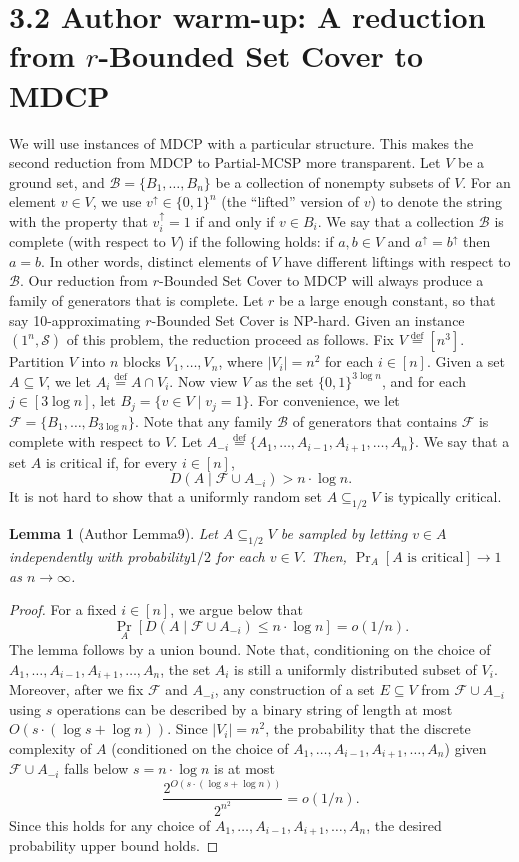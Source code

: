 \documentclass[10pt,a4paper]{article}
\newtheorem{ntlemma}[nttheorem]{Lemma}
\begin{document}
\section*{3.2 Author warm-up: A reduction from $r$-Bounded Set Cover to MDCP}
We will use instances of MDCP with a particular structure. This makes the second reduction from MDCP to Partial-MCSP more transparent.
Let $V$ be a ground set, and $\mathcal B=\{B_1,\ldots,B_n\}$ be a collection of nonempty subsets of $V$. For an element $v\in V$, we use $v^\uparrow\in\{0,1\}^n$ (the ``lifted'' version of $v$) to denote the string with the property that $v_i^\uparrow=1$ if and only if $v\in B_i$. We say that a collection $\mathcal B$ is complete (with respect to $V$) if the following holds: if $a,b\in V$ and $a^\uparrow=b^\uparrow$ then $a=b$. In other words, distinct elements of $V$ have different liftings with respect to $\mathcal B$. Our reduction from $r$-Bounded Set Cover to MDCP will always produce a family of generators that is complete.
Let $r$ be a large enough constant, so that say 10-approximating $r$-Bounded Set Cover is NP-hard. Given an instance $(1^n,\mathcal S)$ of this problem, the reduction proceed as follows. Fix $V\stackrel{\mathrm{def}}=[n^3]$. Partition $V$ into $n$ blocks $V_1,\ldots,V_n$, where $|V_i|=n^2$ for each $i\in[n]$. Given a set $A\subseteq V$, we let $A_i\stackrel{\mathrm{def}}=A\cap V_i$. Now view $V$ as the set $\{0,1\}^{3\log n}$, and for each $j\in[3\log n]$, let $B_j=\{v\in V\mid v_j=1\}$. For convenience, we let $\mathcal F=\{B_1,\ldots,B_{3\log n}\}$. Note that any family $\mathcal B$ of generators that contains $\mathcal F$ is complete with respect to $V$.
Let $A_{-i}\stackrel{\mathrm{def}}=\{A_1,\ldots,A_{i-1},A_{i+1},\ldots,A_n\}$. We say that a set $A$ is critical if, for every $i\in[n]$,
\[D(A\mid\mathcal F\cup A_{-i})>n\cdot\log n.\]
It is not hard to show that a uniformly random set $A\subseteq_{1/2}V$ is typically critical.
\setcounter{nttheorem}{8}
\begin{ntlemma}[Author Lemma9]
Let $A\subseteq_{1/2}V$ be sampled by letting $v\in A$ independently with probability$1/2$ for each $v\in V$. Then, $\Pr_A[A\text{ is critical}]\to1$ as $n\to\infty$.
\end{ntlemma}
\begin{proof}
For a fixed $i\in[n]$, we argue below that
\[\Pr_A[D(A\mid\mathcal F\cup A_{-i})\leq n\cdot\log n]=o(1/n).\]
The lemma follows by a union bound.
Note that, conditioning on the choice of $A_1,\ldots,A_{i-1},A_{i+1},\ldots,A_n$, the set $A_i$ is still a uniformly distributed subset of $V_i$. Moreover, after we fix $\mathcal F$ and $A_{-i}$, any construction of a set $E\subseteq V$ from $\mathcal F\cup A_{-i}$ using $s$ operations can be described by a binary string of length at most $O(s\cdot(\log s+\log n))$. Since $|V_i|=n^2$, the probability that the discrete complexity of $A$ (conditioned on the choice of $A_1,\ldots,A_{i-1},A_{i+1},\ldots,A_n$) given $\mathcal F\cup A_{-i}$ falls below $s=n\cdot\log n$ is at most
\[\frac{2^{O(s\cdot(\log s+\log n))}}{2^{n^2}}=o(1/n).\]
Since this holds for any choice of $A_1,\ldots,A_{i-1},A_{i+1},\ldots,A_n$, the desired probability upper bound holds.
\end{proof}
\end{document}
